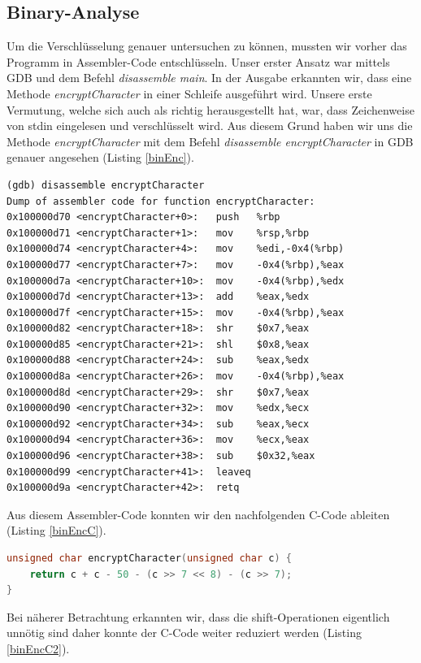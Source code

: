 \documentclass[12pt]{article}
\begin{document}
\subsection{Binary-Analyse}
Um die Verschlüsselung genauer untersuchen zu können, mussten wir vorher das Programm in Assembler-Code entschlüsseln. Unser erster Ansatz war mittels GDB und dem Befehl \emph{disassemble main}. In der Ausgabe erkannten wir, dass eine Methode \emph{encryptCharacter} in einer Schleife ausgeführt wird. Unsere erste Vermutung, welche sich auch als richtig herausgestellt hat, war, dass Zeichenweise von stdin eingelesen und verschlüsselt wird. Aus diesem Grund haben wir uns die Methode \emph{encryptCharacter} mit dem Befehl \emph{disassemble encryptCharacter} in GDB genauer angesehen (Listing \ref{binEnc}). 
\begin{lstlisting}[caption={Assembler-Code der Methode encryptCharacter},label=binEnc,basicstyle=\footnotesize]
(gdb) disassemble encryptCharacter
Dump of assembler code for function encryptCharacter:
0x100000d70 <encryptCharacter+0>:	push   %rbp
0x100000d71 <encryptCharacter+1>:	mov    %rsp,%rbp
0x100000d74 <encryptCharacter+4>:	mov    %edi,-0x4(%rbp)
0x100000d77 <encryptCharacter+7>:	mov    -0x4(%rbp),%eax
0x100000d7a <encryptCharacter+10>:	mov    -0x4(%rbp),%edx
0x100000d7d <encryptCharacter+13>:	add    %eax,%edx
0x100000d7f <encryptCharacter+15>:	mov    -0x4(%rbp),%eax
0x100000d82 <encryptCharacter+18>:	shr    $0x7,%eax
0x100000d85 <encryptCharacter+21>:	shl    $0x8,%eax
0x100000d88 <encryptCharacter+24>:	sub    %eax,%edx
0x100000d8a <encryptCharacter+26>:	mov    -0x4(%rbp),%eax
0x100000d8d <encryptCharacter+29>:	shr    $0x7,%eax
0x100000d90 <encryptCharacter+32>:	mov    %edx,%ecx
0x100000d92 <encryptCharacter+34>:	sub    %eax,%ecx
0x100000d94 <encryptCharacter+36>:	mov    %ecx,%eax
0x100000d96 <encryptCharacter+38>:	sub    $0x32,%eax
0x100000d99 <encryptCharacter+41>:	leaveq 
0x100000d9a <encryptCharacter+42>:	retq  
\end{lstlisting}
Aus diesem Assembler-Code konnten wir den nachfolgenden C-Code ableiten (Listing \ref{binEncC}).
\begin{lstlisting}[language=C, caption={C-Code der Methode encryptCharacter},label=binEncC,basicstyle=\footnotesize]
unsigned char encryptCharacter(unsigned char c) {
    return c + c - 50 - (c >> 7 << 8) - (c >> 7);
}
\end{lstlisting}
Bei näherer Betrachtung erkannten wir, dass die shift-Operationen eigentlich unnötig sind daher konnte der C-Code weiter reduziert werden (Listing \ref{binEncC2}).
\end{document}
